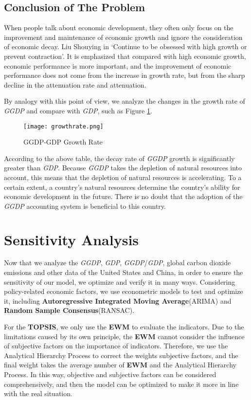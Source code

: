 \documentclass[12pt]{article}
\begin{document}
	\newpage
	
	\subsection{Conclusion of The Problem} %
	When people talk about economic development, they often only focus on the improvement and maintenance of economic growth and ignore the consideration of economic decay.
	Liu Shouying in `Continue to be obsessed with high growth or prevent contraction'.
	It is emphasized that compared with high economic growth, economic performance is more important, and the improvement of economic performance does not come from the increase in growth rate, but from the sharp decline in the attenuation rate and attenuation\cite{10}.
	
	By analogy with this point of view, we analyze the changes in the growth rate of \textit{GGDP} and compare with \textit{GDP}, such as Figure \ref{fig:growthrate}.
	
	
	\begin{figure}[!htbp]
		\centering
		\texttt{[image: growthrate.png]}
		\caption{GGDP-GDP Growth Rate}\label{fig:growthrate}
	\end{figure}

	According to the above table, the decay rate of \textit{GGDP} growth is significantly greater than \textit{GDP}.
	Because \textit{GGDP} takes the depletion of natural resources into account, this means that the depletion of natural resources is accelerating.
	To a certain extent, a country's natural resources determine the country's ability for economic development in the future.
	There is no doubt that the adoption of the \textit{GGDP} accounting system is beneficial to this country.

	
	\section{Sensitivity Analysis} %
	Now that we analyze the \textit{GGDP}, \textit{GDP}, \textit{GGDP}/\textit{GDP}, global carbon dioxide emissions and other data of the United States and China, in order to ensure the sensitivity of our model, we optimize and verify it in many ways.
	Considering policy-related economic factors, we use econometric models to test and optimize it, including \textbf{Autoregressive Integrated Moving Average}(ARIMA) and \textbf{Random Sample Consensus}(RANSAC). 
	
	For the \textbf{TOPSIS}, we only use the \textbf{EWM} to evaluate the indicators. Due to the limitations caused by its own principle, the \textbf{EWM} cannot consider the influence of subjective factors on the importance of indicators.
	Therefore, we use the Analytical Hierarchy Process to correct the weights subjective factors, and the final weight takes the average number of \textbf{EWM} and the Analytical Hierarchy Process.
	In this way, objective and subjective factors can be considered comprehensively, and then the model can be optimized to make it more in line with the real situation.
	
\end{document}
